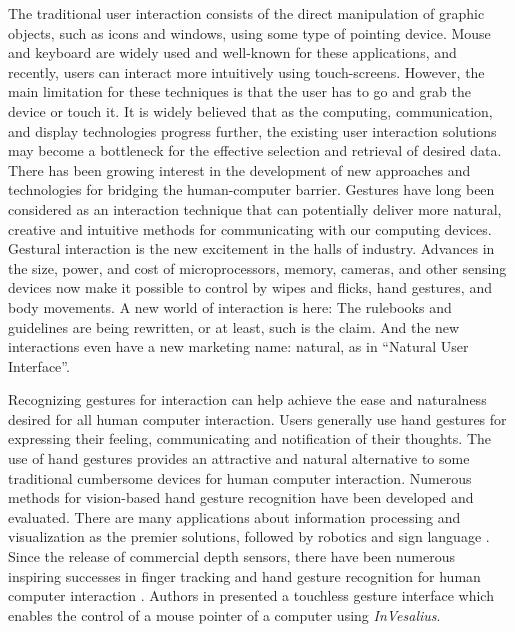 The traditional user interaction consists of the direct manipulation of graphic objects, such as icons and windows, using some type of pointing device. Mouse and keyboard are widely used and well-known for these applications, and recently, users can interact more intuitively using touch-screens. However, the main limitation for these techniques is that the user has to go and grab the device or touch it.  
It is widely believed that as the computing, communication, and display technologies progress further, the existing user interaction solutions may become  a bottleneck for the effective selection and retrieval of desired data.
There has been growing interest in the development of new approaches and technologies for bridging the human-computer barrier. Gestures have long been considered as an interaction technique that can potentially deliver more natural, creative and intuitive methods for communicating with our computing devices\cite{Rautaray2015}. 
Gestural interaction is the new excitement in the halls of industry. Advances in the size, power, and cost of microprocessors, memory, cameras, and other sensing devices now make it possible to control by wipes and flicks, hand gestures, and body movements. A new world of interaction is here: The rulebooks and guidelines are being rewritten, or at least, such is the claim. And the new interactions even have a new marketing name: natural, as in ``Natural User Interface''.

Recognizing gestures for interaction can help achieve the ease and naturalness desired for all human computer interaction. Users generally use hand gestures for expressing their feeling, communicating and notification of their thoughts. The use of hand gestures provides an attractive and natural alternative to some traditional cumbersome devices for human computer interaction. 
Numerous methods for vision-based hand gesture recognition have been developed and evaluated. There are many applications about information processing \cite{Moyle2002,Lenman2002} and visualization as the premier solutions, followed by robotics and sign language \cite{Swindells2002,Osawa2000}. 
Since the release of commercial depth sensors, there have been numerous inspiring successes in finger tracking and hand gesture recognition for human computer interaction \cite{ZhouRen2011,Kulshreshth2013}. Authors in \cite{Ruppert2012a} presented a touchless gesture interface which enables the control of a mouse pointer of a computer using \textit{InVesalius}. 


